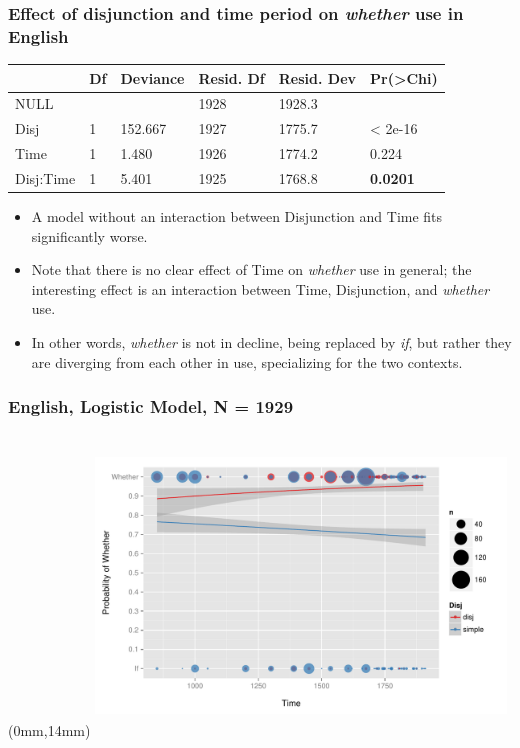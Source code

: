 \documentclass[hyperref={pdfpagelabels=false}]{beamer}
\begin{document}
\begin{frame} 
 \frametitle{Effect of disjunction and time period on \textsl{whether} use in English}
 \begin{center}
                    
\begin{tabular}{llllll}
\hline
  & Df & Deviance & Resid. Df & Resid. Dev &  Pr(>Chi) \\
\hline
NULL &   &    &            1928  &   1928.3 &  \\
Disj   &    1 & 152.667  &    1927  &   1775.7 & < 2e-16\\
Time     &    1  &  1.480  &    1926  &   1774.2  & 0.224\\
Disj:Time  & 1  &  5.401   &   1925   &  1768.8 &    \textbf{0.0201}\\
\hline
\end{tabular}
\end{center}
\begin{itemize}
\item A model without an interaction between Disjunction and Time fits significantly worse.
\item Note that there is no clear effect of Time on \textsl{whether} use in general; the interesting effect is an interaction between Time, Disjunction, and  \textsl{whether} use.
\item In other words, \textsl{whether} is not in decline, being replaced by \textsl{if}, but rather they are diverging from each other in use, specializing for the two contexts.
\end{itemize}
\end{frame}

\begin{frame} 
 \frametitle{English, Logistic Model, N = 1929}
 \begin{center}
 \begin{textblock*}{125mm}(0mm,14mm)
\includegraphics[width=109mm,height=80mm,clip=true,trim=0mm 0mm 0mm 0mm]{whetherifEngmodel.pdf}
\end{textblock*}
 \end{center}
\end{frame}
\end{document}
